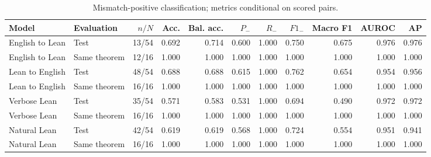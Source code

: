 \begin{table}[htbp]
\centering
\caption{Mismatch-positive classification; metrics conditional on scored pairs.}
\label{tab:intermediaries-metrics}
\small
\begin{adjustbox}{max width=\textwidth}
\begin{tabular}{llrrrrrrrrr}
\toprule
Model & Evaluation & $n/N$ & Acc. & Bal. acc. & $P_-$ & $R_-$ & $F1_-$ & Macro F1 & AUROC & AP \\
\midrule
English to Lean & Test & 13/54 & 0.692 & 0.714 & 0.600 & 1.000 & 0.750 & 0.675 & 0.976 & 0.976 \\
English to Lean & Same theorem & 12/16 & 1.000 & 1.000 & 1.000 & 1.000 & 1.000 & 1.000 & 1.000 & 1.000 \\
Lean to English & Test & 48/54 & 0.688 & 0.688 & 0.615 & 1.000 & 0.762 & 0.654 & 0.954 & 0.956 \\
Lean to English & Same theorem & 16/16 & 1.000 & 1.000 & 1.000 & 1.000 & 1.000 & 1.000 & 1.000 & 1.000 \\
Verbose Lean & Test & 35/54 & 0.571 & 0.583 & 0.531 & 1.000 & 0.694 & 0.490 & 0.972 & 0.972 \\
Verbose Lean & Same theorem & 16/16 & 1.000 & 1.000 & 1.000 & 1.000 & 1.000 & 1.000 & 1.000 & 1.000 \\
Natural Lean & Test & 42/54 & 0.619 & 0.619 & 0.568 & 1.000 & 0.724 & 0.554 & 0.951 & 0.941 \\
Natural Lean & Same theorem & 16/16 & 1.000 & 1.000 & 1.000 & 1.000 & 1.000 & 1.000 & 1.000 & 1.000 \\
\bottomrule
\end{tabular}
\end{adjustbox}
\end{table}
